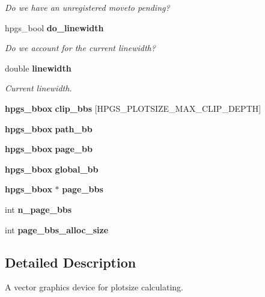 \begin{CompactItemize}
\begin{CompactList}\small\item\em Do we have an unregistered moveto pending? \item\end{CompactList}\item 
hpgs\_\-bool {\bf do\_\-linewidth}\label{structhpgs__plotsize__device__st_e8e92266b09da342dbd1f1cc26dd914d}

\begin{CompactList}\small\item\em Do we account for the current linewidth? \item\end{CompactList}\item 
double {\bf linewidth}\label{structhpgs__plotsize__device__st_e18ef2c36ee97539c25b88dd1cbf4368}

\begin{CompactList}\small\item\em Current linewidth. \item\end{CompactList}\item 
{\bf hpgs\_\-bbox} \textbf{clip\_\-bbs} [HPGS\_\-PLOTSIZE\_\-MAX\_\-CLIP\_\-DEPTH]\label{structhpgs__plotsize__device__st_ce813b5e80f82a23bfd48844c21bc67f}

\item 
{\bf hpgs\_\-bbox} {\bf path\_\-bb}
\item 
{\bf hpgs\_\-bbox} {\bf page\_\-bb}
\item 
{\bf hpgs\_\-bbox} {\bf global\_\-bb}
\end{CompactItemize}
\begin{Indent}{\bf }\par
\begin{CompactItemize}
\item 
{\bf hpgs\_\-bbox} $\ast$ {\bf page\_\-bbs}
\item 
int {\bf n\_\-page\_\-bbs}
\item 
int \textbf{page\_\-bbs\_\-alloc\_\-size}\label{structhpgs__plotsize__device__st_0d0a3522e149fdd32062286a75316d4a}

\end{CompactItemize}
\end{Indent}


\subsection{Detailed Description}
A vector graphics device for plotsize calculating. 

